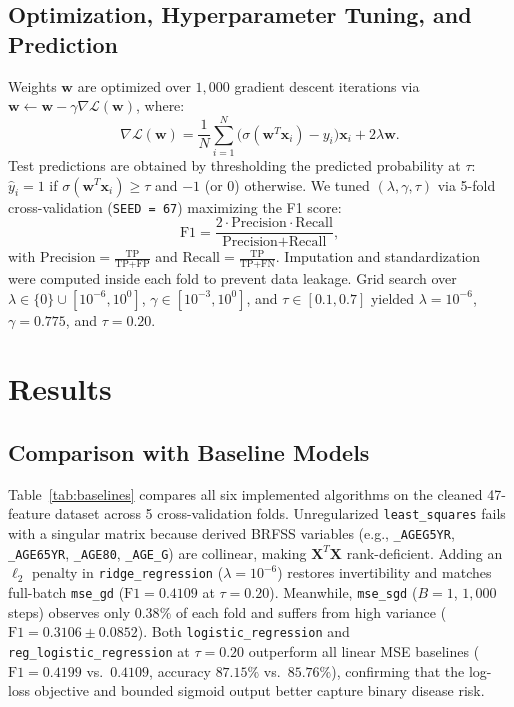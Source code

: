 \documentclass[10pt,conference,compsocconf]{IEEEtran}
\begin{document}
\subsection{Optimization, Hyperparameter Tuning, and Prediction}
Weights $\mathbf{w}$ are optimized over $1{,}000$ gradient descent iterations via $\mathbf{w} \leftarrow \mathbf{w} - \gamma \nabla \mathcal{L}(\mathbf{w})$, where:
\begin{equation}
    \nabla \mathcal{L}(\mathbf{w}) = \frac{1}{N} \sum_{i=1}^{N} \big(\sigma(\mathbf{w}^T \mathbf{x}_i) - y_i\big) \mathbf{x}_i + 2\lambda \mathbf{w}.
\end{equation}
Test predictions are obtained by thresholding the predicted probability at $\tau$: $\hat{y}_i = 1$ if $\sigma(\mathbf{w}^T \mathbf{x}_i) \geq \tau$ and $-1$ (or $0$) otherwise. We tuned $(\lambda, \gamma, \tau)$ via 5-fold cross-validation (\texttt{SEED = 67}) maximizing the F1 score:
\begin{equation}
    \text{F1} = \frac{2 \cdot \text{Precision} \cdot \text{Recall}}{\text{Precision} + \text{Recall}},
\end{equation}
with $\text{Precision} = \frac{\text{TP}}{\text{TP}+\text{FP}}$ and $\text{Recall} = \frac{\text{TP}}{\text{TP}+\text{FN}}$. Imputation and standardization were computed inside each fold to prevent data leakage. Grid search over $\lambda \in \{0\} \cup [10^{-6}, 10^0]$, $\gamma \in [10^{-3}, 10^0]$, and $\tau \in [0.1, 0.7]$ yielded $\lambda = 10^{-6}$, $\gamma = 0.775$, and $\tau = 0.20$.

\section{Results}

\subsection{Comparison with Baseline Models}
Table~\ref{tab:baselines} compares all six implemented algorithms on the cleaned 47-feature dataset across 5 cross-validation folds. Unregularized \texttt{least\_squares} fails with a singular matrix because derived BRFSS variables (e.g., \texttt{\_AGEG5YR}, \texttt{\_AGE65YR}, \texttt{\_AGE80}, \texttt{\_AGE\_G}) are collinear, making $\mathbf{X}^T\mathbf{X}$ rank-deficient. Adding an $\ell_2$ penalty in \texttt{ridge\_regression} ($\lambda = 10^{-6}$) restores invertibility and matches full-batch \texttt{mse\_gd} ($\text{F1} = 0.4109$ at $\tau = 0.20$). Meanwhile, \texttt{mse\_sgd} ($B=1$, $1{,}000$ steps) observes only $0.38\%$ of each fold and suffers from high variance ($\text{F1} = 0.3106 \pm 0.0852$). Both \texttt{logistic\_regression} and \texttt{reg\_logistic\_regression} at $\tau = 0.20$ outperform all linear MSE baselines ($\text{F1} = 0.4199$ vs.\ $0.4109$, accuracy $87.15\%$ vs.\ $85.76\%$), confirming that the log-loss objective and bounded sigmoid output better capture binary disease risk.
\end{document}
